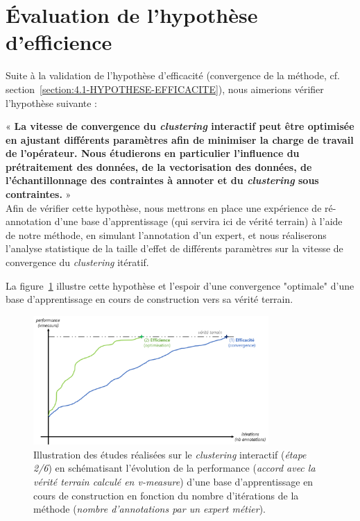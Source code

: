 \section{Évaluation de l'hypothèse d'efficience}
\label{section:4.2-HYPOTHESE-EFFICIENCE}

	Suite à la validation de l'hypothèse d'efficacité (convergence de la méthode, cf. section~\ref{section:4.1-HYPOTHESE-EFFICACITE}), nous aimerions vérifier l'hypothèse suivante :

	\begin{tcolorbox}[
		title=\faVial~\textbf{Hypothèse d'efficience}~\faVial,
		colback=colorTcolorboxHypothesis!15,
		colframe=colorTcolorboxHypothesis!75,
		width=\linewidth
	]

		« \textbf{
			La vitesse de convergence du \textit{clustering} interactif peut être optimisée en ajustant différents paramètres afin de minimiser la charge de travail de l'opérateur. Nous étudierons en particulier l'influence du prétraitement des données, de la vectorisation des données, de l'échantillonnage des contraintes à annoter et du \textit{clustering} sous contraintes.
		} » \\
		
		Afin de vérifier cette hypothèse, nous mettrons en place une expérience de ré-annotation d'une base d'apprentissage (qui servira ici de vérité terrain) à l'aide de notre méthode, en simulant l'annotation d'un expert, et nous réaliserons l'analyse statistique de la taille d'effet de différents paramètres sur la vitesse de convergence du \textit{clustering} itératif.
		
		La figure~\ref{figure:4.2-HYPOTHESE-EFFICIENCE} illustre cette hypothèse et l'espoir d'une convergence "optimale" d'une base d'apprentissage en cours de construction vers sa vérité terrain.
		\begin{figure}[H]  %
			\centering
			\includegraphics[width=0.8\textwidth]{figures/hypotheses-02-efficience}
			\caption{Illustration des études réalisées sur le \textit{clustering} interactif (\textit{étape 2/6}) en schématisant l'évolution de la performance (\textit{accord avec la vérité terrain calculé en v-measure}) d'une base d'apprentissage en cours de construction en fonction du nombre d'itérations de la méthode (\textit{nombre d'annotations par un expert métier}).}
			\label{figure:4.2-HYPOTHESE-EFFICIENCE}
		\end{figure}


\end{tcolorbox}
